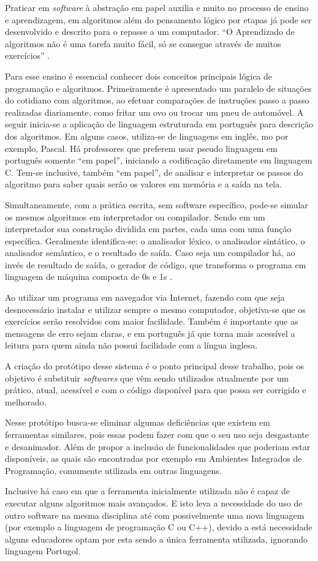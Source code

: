 
Praticar em \textit{software} à abstração em papel auxilia e muito no processo
de ensino e aprendizagem, em algoritmos além do pensamento lógico por etapas já
pode ser desenvolvido e descrito para o repasse a um computador.
``O Aprendizado de algoritmos não é uma tarefa muito fácil, só se consegue
através de muitos exercícios'' \cite{lopes2002etal}.

Para esse ensino é essencial conhecer dois conceitos principais lógica de
programação e algoritmos. Primeiramente é apresentado um paralelo de situações
do cotidiano com algoritmos, ao efetuar comparações de instruções passo a passo
realizadas diariamente, como fritar um ovo ou trocar um pneu de automóvel. A
seguir inicia-se a aplicação de linguagem estruturada em português para
descrição dos algoritmos. Em alguns casos, utiliza-se de linguagens em inglês,
mo por exemplo, Pascal. Há professores que preferem usar pseudo linguagem em
português somente ``em papel'', iniciando a codificação diretamente em linguagem
C. Tem-se inclusive, também ``em papel'', de analisar e interpretar os passos do
algoritmo para saber quais serão os valores em memória e a saída na tela.

Simultaneamente, com a prática escrita, sem software específico, pode-se simular
os mesmos algoritmos em interpretador ou compilador. Sendo em um interpretador
sua construção dividida em partes, cada uma com uma função específica.
Geralmente identifica-se: o analisador léxico, o analisador sintático, o
analisador semântico, e o resultado de saída. Caso seja um compilador há, ao
invés de resultado de saída, o gerador de código, que transforma o programa em
linguagem de máquina composta de 0s e 1s \cite{delamaro2004}.

Ao utilizar um programa em navegador via Internet, fazendo com que seja
desnecessário instalar e utilizar sempre o mesmo computador, objetiva-se que os
exercícios serão resolvidos com maior facilidade. Também é importante que as
mensagens de erro sejam claras, e em português já que torna mais acessível a
leitura para quem ainda não possui facilidade com a língua inglesa.

A criação do protótipo desse sistema é o ponto principal desse trabalho, pois os
objetivo é substituir \textit{softwares} que vêm sendo utilizados atualmente por
um prático, atual, acessível e com o código disponível para que possa ser
corrigido e melhorado.

Nesse protótipo busca-se eliminar algumas deficiências que existem em
ferramentas similares, pois essas podem fazer com que o seu uso seja desgastante
e desanimador. Além de propor a inclusão de funcionalidades que poderiam estar
disponíveis, as quais são encontradas por exemplo em Ambientes Integrados de
Programação, comumente utilizada em outras linguagens.


Inclusive há caso em que a ferramenta inicialmente utilizada não é capaz de
executar alguns algoritmos mais avançados. E isto leva a necessidade do uso
de outro software na mesma disciplina até com possivelmente uma nova
linguagem (por exemplo a linguagem de programação C ou C++), devido a está
necessidade alguns educadores optam por esta sendo a única ferramenta utilizada,
ignorando linguagem Portugol.
